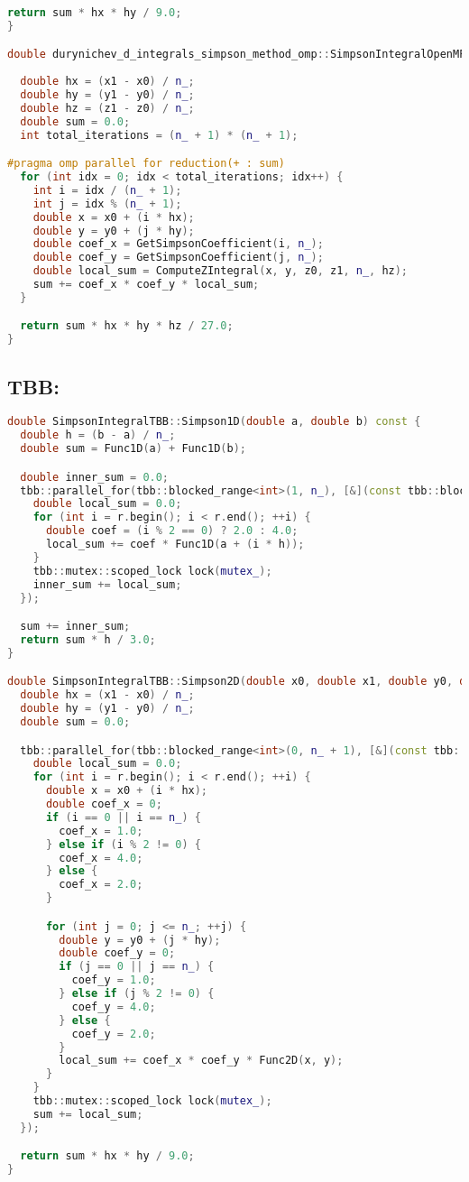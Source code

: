 \documentclass[12pt]{article}
\begin{document}
\begin{lstlisting}[language=C++]
  return sum * hx * hy / 9.0;
}

double durynichev_d_integrals_simpson_method_omp::SimpsonIntegralOpenMP::Simpson3D(double x0, double x1, double y0,
                                                                                   double y1, double z0, double z1) {
  double hx = (x1 - x0) / n_;
  double hy = (y1 - y0) / n_;
  double hz = (z1 - z0) / n_;
  double sum = 0.0;
  int total_iterations = (n_ + 1) * (n_ + 1);

#pragma omp parallel for reduction(+ : sum)
  for (int idx = 0; idx < total_iterations; idx++) {
    int i = idx / (n_ + 1);
    int j = idx % (n_ + 1);
    double x = x0 + (i * hx);
    double y = y0 + (j * hy);
    double coef_x = GetSimpsonCoefficient(i, n_);
    double coef_y = GetSimpsonCoefficient(j, n_);
    double local_sum = ComputeZIntegral(x, y, z0, z1, n_, hz);
    sum += coef_x * coef_y * local_sum;
  }

  return sum * hx * hy * hz / 27.0;
}
\end{lstlisting}

\subsection*{TBB:}
\begin{lstlisting}[language=C++]
double SimpsonIntegralTBB::Simpson1D(double a, double b) const {
  double h = (b - a) / n_;
  double sum = Func1D(a) + Func1D(b);

  double inner_sum = 0.0;
  tbb::parallel_for(tbb::blocked_range<int>(1, n_), [&](const tbb::blocked_range<int>& r) {
    double local_sum = 0.0;
    for (int i = r.begin(); i < r.end(); ++i) {
      double coef = (i % 2 == 0) ? 2.0 : 4.0;
      local_sum += coef * Func1D(a + (i * h));
    }
    tbb::mutex::scoped_lock lock(mutex_);
    inner_sum += local_sum;
  });

  sum += inner_sum;
  return sum * h / 3.0;
}

double SimpsonIntegralTBB::Simpson2D(double x0, double x1, double y0, double y1) const {
  double hx = (x1 - x0) / n_;
  double hy = (y1 - y0) / n_;
  double sum = 0.0;

  tbb::parallel_for(tbb::blocked_range<int>(0, n_ + 1), [&](const tbb::blocked_range<int>& r) {
    double local_sum = 0.0;
    for (int i = r.begin(); i < r.end(); ++i) {
      double x = x0 + (i * hx);
      double coef_x = 0;
      if (i == 0 || i == n_) {
        coef_x = 1.0;
      } else if (i % 2 != 0) {
        coef_x = 4.0;
      } else {
        coef_x = 2.0;
      }

      for (int j = 0; j <= n_; ++j) {
        double y = y0 + (j * hy);
        double coef_y = 0;
        if (j == 0 || j == n_) {
          coef_y = 1.0;
        } else if (j % 2 != 0) {
          coef_y = 4.0;
        } else {
          coef_y = 2.0;
        }
        local_sum += coef_x * coef_y * Func2D(x, y);
      }
    }
    tbb::mutex::scoped_lock lock(mutex_);
    sum += local_sum;
  });

  return sum * hx * hy / 9.0;
}
\end{lstlisting}
\end{document}
